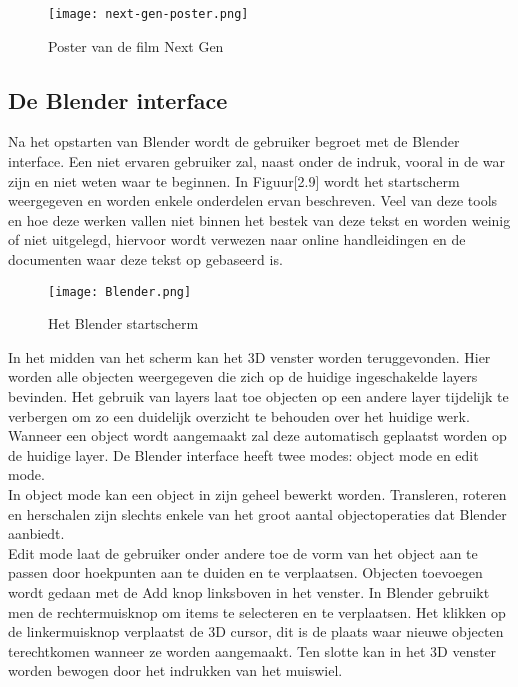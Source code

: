 \begin{figure}[H]
\texttt{[image: next-gen-poster.png]}
\caption{Poster van de film Next Gen \citep*{NEXT1}}
\end{figure}

    



\subsection{De Blender interface}
Na het opstarten van Blender wordt de gebruiker begroet met de Blender interface. Een niet ervaren gebruiker zal, naast onder de indruk, vooral in de war zijn en niet weten waar te beginnen. In Figuur[2.9] wordt het startscherm weergegeven en worden enkele onderdelen ervan beschreven. Veel van deze tools en hoe deze werken vallen niet binnen het bestek van deze tekst en worden weinig of niet uitgelegd, hiervoor wordt verwezen naar online handleidingen en de documenten waar deze tekst op gebaseerd is.\citep*{BLEN1}\citep*{API1} 

\begin{figure}[h]
\texttt{[image: Blender.png]}
\caption{Het Blender startscherm}
\end{figure}

\par
In het midden van het scherm kan het 3D venster worden teruggevonden. Hier worden alle objecten weergegeven die zich op de huidige ingeschakelde layers bevinden. Het gebruik van layers laat toe objecten op een andere layer tijdelijk te verbergen om zo een duidelijk overzicht te behouden over het huidige werk. Wanneer een object wordt aangemaakt zal deze automatisch geplaatst worden op de huidige layer. De Blender interface heeft twee modes: object mode en edit mode.
\\
In object mode kan een object in zijn geheel bewerkt worden. Transleren, roteren en herschalen zijn slechts enkele van het groot aantal objectoperaties dat Blender aanbiedt. 
\\
Edit mode laat de gebruiker onder andere toe de vorm van het object aan te passen door hoekpunten aan te duiden en te verplaatsen. 
Objecten toevoegen wordt gedaan met de Add knop linksboven in het venster. 
In Blender gebruikt men de rechtermuisknop om items te selecteren en te verplaatsen. Het klikken op de linkermuisknop verplaatst de 3D cursor, dit is de plaats waar nieuwe objecten terechtkomen wanneer ze worden aangemaakt. Ten slotte kan in het 3D venster worden bewogen door het indrukken van het muiswiel.

